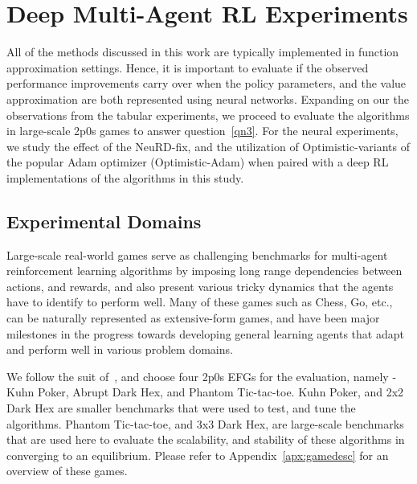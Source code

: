 \chapter{Deep Multi-Agent RL Experiments}
All of the methods discussed in this work are typically implemented in function approximation
settings.
Hence, it is important to evaluate if the observed performance improvements carry over when the
policy parameters, and the value approximation are both represented using neural networks.
Expanding on our the observations from the tabular experiments, we proceed to evaluate the
algorithms in large-scale 2p0s games to answer question~\ref{qn3}.
For the neural experiments, we study the effect of the NeuRD-fix, and the utilization of
Optimistic-variants of the popular Adam optimizer (Optimistic-Adam) when paired with a deep RL
implementations of the algorithms in this study.

\section{Experimental Domains}
Large-scale real-world games serve as challenging benchmarks for multi-agent reinforcement learning
algorithms by imposing long range dependencies between actions, and rewards, and also present
various tricky dynamics that the agents have to identify to perform well.
Many of these games such as Chess, Go, etc., can be naturally represented as extensive-form games,
and have been major milestones in the progress towards developing general learning agents that
adapt and perform well in various problem domains.

We follow the suit of~\cite{sokotaUnified2023}, and choose four 2p0s EFGs for the evaluation,
namely - Kuhn Poker, Abrupt Dark Hex, and Phantom Tic-tac-toe.
Kuhn Poker, and 2x2 Dark Hex are smaller benchmarks that were used to test, and tune the
algorithms.
Phantom Tic-tac-toe, and 3x3 Dark Hex, are large-scale benchmarks that are used here to evaluate
the scalability, and stability of these algorithms in converging to an equilibrium.
Please refer to Appendix~\ref{apx:gamedesc} for an overview of these games.

